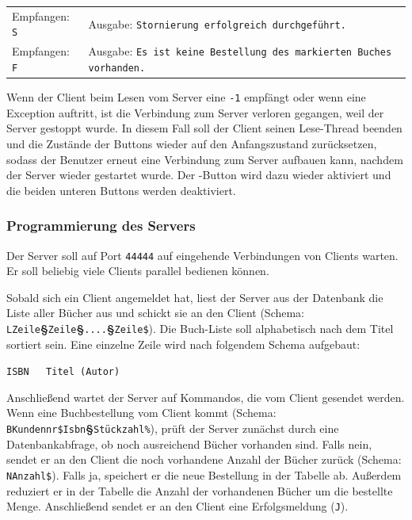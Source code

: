 \bgroup
\def\arraystretch{1.2}
\begin{tabularx}{\textwidth}{p{30mm} X}
Empfangen: \lstinline|S| &
Ausgabe: \lstinline|Stornierung erfolgreich durchgeführt.| \\
Empfangen: \lstinline|F| &
Ausgabe: \lstinline|Es ist keine Bestellung des markierten Buches vorhanden.|
\\
\end{tabularx}
\egroup

Wenn der Client beim Lesen vom Server eine \lstinline|-1| empfängt oder wenn
eine Exception auftritt, ist die Verbindung zum Server verloren gegangen, weil
der Server gestoppt wurde. In diesem Fall soll der Client seinen Lese-Thread
beenden und die Zustände der Buttons wieder auf den Anfangszustand
zurücksetzen, sodass der Benutzer erneut eine Verbindung zum Server aufbauen
kann, nachdem der Server wieder gestartet wurde. Der
-Button wird dazu wieder aktiviert und die beiden unteren
Buttons werden deaktiviert.


\subsubsection{Programmierung des Servers}

Der Server soll auf Port \lstinline|44444| auf eingehende Verbindungen von
Clients warten. Er soll beliebig viele Clients parallel bedienen können.

Sobald sich ein Client angemeldet hat, liest der Server aus der Datenbank die
Liste aller Bücher aus und schickt sie an den Client (Schema:
\lstinline|LZeile|\textbf{§}\lstinline|Zeile|\textbf{§}\lstinline|....|\textbf{§}\lstinline|Zeile$|).
Die Buch-Liste soll alphabetisch nach dem Titel sortiert sein. Eine einzelne
Zeile wird nach folgendem Schema aufgebaut:

\lstinline|ISBN   Titel (Autor)|

Anschließend wartet der Server auf Kommandos, die vom Client gesendet werden.
Wenn eine Buchbestellung vom Client kommt (Schema:
\lstinline|BKundennr$Isbn|\textbf{§}\lstinline|Stückzahl%|), prüft der Server
zunächst durch eine Datenbankabfrage, ob noch ausreichend Bücher vorhanden
sind. Falls nein, sendet er an den Client die noch vorhandene Anzahl der Bücher
zurück (Schema: \lstinline|NAnzahl$|). Falls ja, speichert er die neue
Bestellung in der Tabelle  ab. Außerdem reduziert er in
der Tabelle  die Anzahl der vorhandenen Bücher um die
bestellte Menge. Anschließend sendet er an den Client eine Erfolgsmeldung
(\lstinline|J|).

